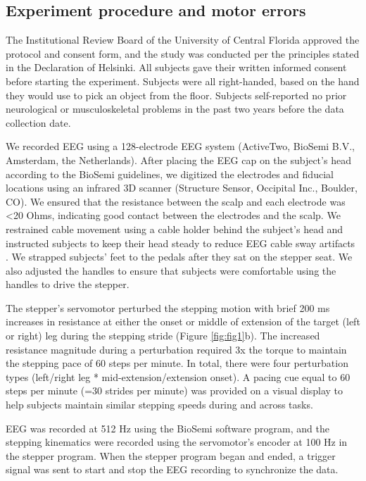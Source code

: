 \documentclass[../thesis_seyed.tex]{subfiles}
\begin{document}
\subsection{Experiment procedure and motor errors}
The Institutional Review Board of the University of Central Florida approved the protocol and consent form, and the study was conducted per the principles stated in the Declaration of Helsinki. All subjects gave their written informed consent before starting the experiment. Subjects were all right-handed, based on the hand they would use to pick an object from the floor. Subjects self-reported no prior neurological or musculoskeletal problems in the past two years before the data collection date.

We recorded EEG using a 128-electrode EEG system (ActiveTwo, BioSemi B.V., Amsterdam, the Netherlands). After placing the EEG cap on the subject’s head according to the BioSemi guidelines, we digitized the electrodes and fiducial locations using an infrared 3D scanner (Structure Sensor, Occipital Inc., Boulder, CO). We ensured that the resistance between the scalp and each electrode was <20 Ohms, indicating good contact between the electrodes and the scalp. We restrained cable movement using a cable holder behind the subject’s head and instructed subjects to keep their head steady to reduce EEG cable sway artifacts \cite{Symeonidou2018-ge}. We strapped subjects' feet to the pedals after they sat on the stepper seat. We also adjusted the handles to ensure that subjects were comfortable using the handles to drive the stepper.

The stepper’s servomotor perturbed the stepping motion with brief 200 ms increases in resistance at either the onset or middle of extension of the target (left or right) leg during the stepping stride (Figure \ref{fig:fig1}b). The increased resistance magnitude during a perturbation required 3x the torque to maintain the stepping pace of 60 steps per minute. In total, there were four perturbation types (left/right leg * mid-extension/extension onset). A {pacing cue} equal to 60 steps per minute (=30 strides per minute) was provided {on a visual display to help subjects} maintain similar stepping speeds during and across tasks. 

EEG was recorded at 512 Hz using the BioSemi software program{, and the stepping kinematics were recorded using the servomotor's encoder at 100 Hz in the stepper program. When the stepper program began and ended,} a trigger signal was sent to start and stop the EEG recording to synchronize the data.
\end{document}
